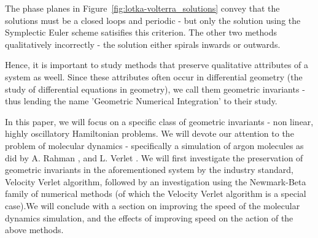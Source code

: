 \documentclass[../Main.tex]{subfiles}
\begin{document}
The phase planes in Figure~\ref{fig:lotka-volterra_solutions} convey that the solutions must be a closed loops and periodic - but only the solution using the Symplectic Euler scheme satisifies this criterion. The other two methods qualitatively incorrectly - the solution either spirals inwards or outwards.

Hence, it is important to study methods that preserve qualitative attributes of a system as weell. Since these attributes often occur in differential geometry (the study of differential equations in geometry), we call them geometric invariants - thus lending the name 'Geometric Numerical Integration' to their study.

In this paper, we will focus on a specific class of geometric invariants - non linear, highly oscillatory Hamiltonian problems. We will devote our attention to the problem of molecular dynamics - specifically a simulation of argon molecules as did by A. Rahman \cite{Rahman1964}, and L. Verlet \cite{Verlet1967}. We will first investigate the preservation of geometric invariants in the aforementioned system by the industry standard, Velocity Verlet algorithm, followed by an investigation using the Newmark-Beta family of numerical methods (of which the Velocity Verlet algorithm is a special case).We will conclude with a section on improving the speed of the molecular dynamics simulation, and the effects of improving speed on the action of the above methods.
\end{document}
